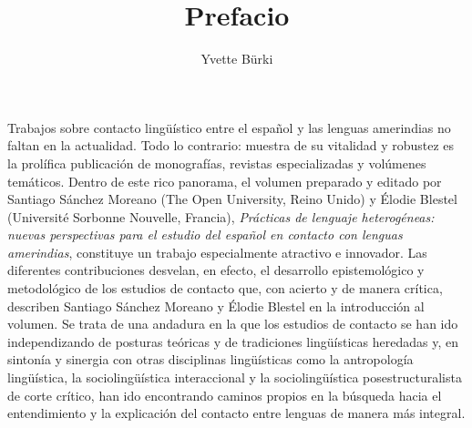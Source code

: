 \documentclass[output=paper]{langscibook}
\author{Yvette Bürki\orcid{0000-0002-3081-3622}\affiliation{Universität Bern}}
\title{Prefacio}
\begin{document}
\maketitle


Trabajos sobre contacto lingüístico entre el español y las lenguas amerindias no faltan en la actualidad. Todo lo contrario: muestra de su vitalidad y robustez es la prolífica publicación de monografías, revistas especializadas y volúmenes temáticos. Dentro de este rico panorama, el volumen preparado y editado por Santiago Sánchez Moreano (The Open University, Reino Unido) y Élodie Blestel (Université Sorbonne Nouvelle, Francia), \textit{Prácticas de lenguaje heterogéneas: nuevas perspectivas para el estudio del español en contacto con lenguas amerindias}, constituye un trabajo especialmente atractivo e innovador. Las diferentes contribuciones desvelan, en efecto, el desarrollo epistemológico y metodológico de los estudios de contacto que, con acierto y de manera crítica, describen Santiago Sánchez Moreano y Élodie Blestel en la introducción al volumen. Se trata de una andadura en la que los estudios de contacto se han ido independizando de posturas teóricas y de tradiciones lingüísticas heredadas y, en sintonía y sinergia con otras disciplinas lingüísticas como la antropología lingüística, la sociolingüística interaccional y la sociolingüística posestructuralista de corte crítico, han ido encontrando caminos propios en la búsqueda hacia el entendimiento y la explicación del contacto entre lenguas de manera más integral. 
\end{document}

